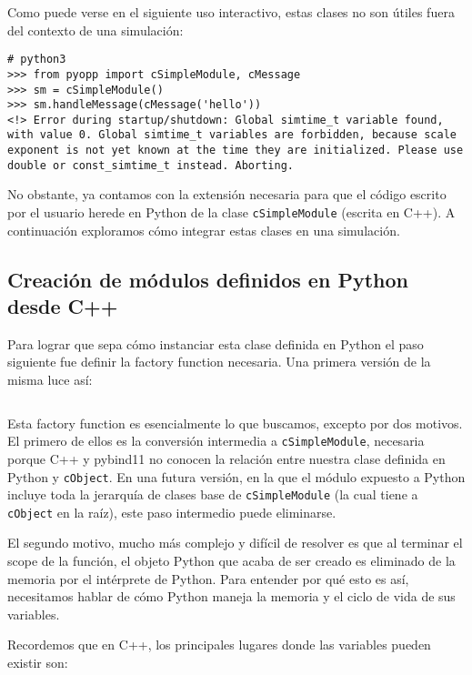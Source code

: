 \inputminted{Python}{codelistings/binding_usage.py}

Como puede verse en el siguiente uso interactivo, estas clases no son útiles
fuera del contexto de una simulación:

\begin{verbatim}
# python3
>>> from pyopp import cSimpleModule, cMessage
>>> sm = cSimpleModule()
>>> sm.handleMessage(cMessage('hello'))
<!> Error during startup/shutdown: Global simtime_t variable found, with value 0. Global simtime_t variables are forbidden, because scale exponent is not yet known at the time they are initialized. Please use double or const_simtime_t instead. Aborting.
\end{verbatim}

No obstante, ya contamos con la extensión necesaria para que el código escrito
por el usuario herede en Python de la clase \verb!cSimpleModule! (escrita en
C++). A continuación exploramos cómo integrar estas clases en una simulación.

\subsection{Creación de módulos definidos en Python desde C++}

Para lograr que \omnetpp{} sepa cómo instanciar esta clase definida en Python el
paso siguiente fue definir la factory function necesaria. Una primera versión
de la misma luce así:

\inputminted{c++}{codelistings/factory_function.cc}

Esta factory function es esencialmente lo que buscamos, excepto por dos
motivos. El primero de ellos es la conversión intermedia a
\verb!cSimpleModule!, necesaria porque C++ y pybind11 no conocen la relación
entre nuestra clase definida en Python y \verb!cObject!. En una futura versión,
en la que el módulo expuesto a Python incluye toda la jerarquía de clases base
de \verb!cSimpleModule! (la cual tiene a \verb!cObject! en la raíz), este paso
intermedio puede eliminarse.

El segundo motivo, mucho más complejo y difícil de resolver es que al terminar
el scope de la función, el objeto Python que acaba de ser creado es eliminado
de la memoria por el intérprete de Python. Para entender por qué esto es así,
necesitamos hablar de cómo Python maneja la memoria y el ciclo de vida de sus
variables.

Recordemos que en C++, los principales lugares donde las variables pueden
existir son:

